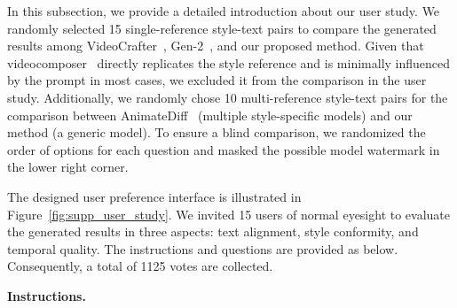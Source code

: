 In this subsection, we provide a detailed introduction about our user study. We randomly selected 15 single-reference style-text pairs to compare the generated results among VideoCrafter~\cite{chen2023videocrafter}, Gen-2~\cite{Gen-2}, and our proposed method. Given that videocomposer~\cite{wang2024videocomposer} directly replicates the style reference and is minimally influenced by the prompt in most cases, we excluded it from the comparison in the user study. Additionally, we randomly chose 10 multi-reference style-text pairs for the comparison between AnimateDiff~\cite{guo2023animatediff} (multiple style-specific models) and our method (a generic model). To ensure a blind comparison, we randomized the order of options for each question and masked the possible model watermark in the lower right corner.

The designed user preference interface is illustrated in Figure~\ref{fig:supp_user_study}. We invited 15 users of normal eyesight to evaluate the generated results in three aspects: text alignment, style conformity, and temporal quality.  The instructions and questions are provided as below.
%
%
Consequently, a total of 1125 votes are collected.\vspace{0.6em}


\noindent\textbf{Instructions.}

